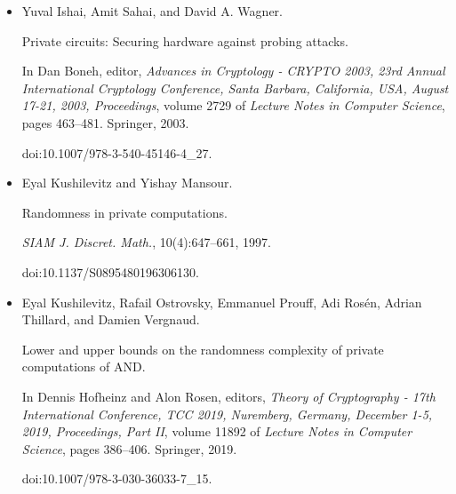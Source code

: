 \documentclass[10pt,a4paper]{article}
\begin{document}
\begin{itemize}
Robust pseudorandom generators.


In Fedor V. Fomin, Rusins Freivalds, Marta Z. Kwiatkowska, and David
Peleg, editors, \emph{Automata, Languages, and Programming - 40th
International Colloquium, ICALP 2013, Riga, Latvia, July 8-12, 2013,
Proceedings, Part I}, volume 7965 of \emph{Lecture Notes in Computer
Science}, pages 576–588. Springer, 2013.


doi:10.1007/978-3-642-39206-1\_49.





\item[] 
[10]

Yuval Ishai, Amit Sahai, and David A. Wagner.


Private circuits: Securing hardware against probing attacks.


In Dan Boneh, editor, \emph{Advances in Cryptology - CRYPTO 2003,
23rd Annual International Cryptology Conference, Santa Barbara, California,
USA, August 17-21, 2003, Proceedings}, volume 2729 of \emph{Lecture Notes in
Computer Science}, pages 463–481. Springer, 2003.


doi:10.1007/978-3-540-45146-4\_27.





\item[] 
[11]

Eyal Kushilevitz and Yishay Mansour.


Randomness in private computations.


\emph{SIAM J. Discret. Math.}, 10(4):647–661, 1997.


doi:10.1137/S0895480196306130.





\item[] 
[12]

Eyal Kushilevitz, Rafail Ostrovsky, Emmanuel Prouff, Adi Rosén, Adrian
Thillard, and Damien Vergnaud.


Lower and upper bounds on the randomness complexity of private
computations of AND.


In Dennis Hofheinz and Alon Rosen, editors, \emph{Theory of
Cryptography - 17th International Conference, TCC 2019, Nuremberg, Germany,
December 1-5, 2019, Proceedings, Part II}, volume 11892 of \emph{Lecture
Notes in Computer Science}, pages 386–406. Springer, 2019.


doi:10.1007/978-3-030-36033-7\_15.






\end{itemize}
\end{document}
